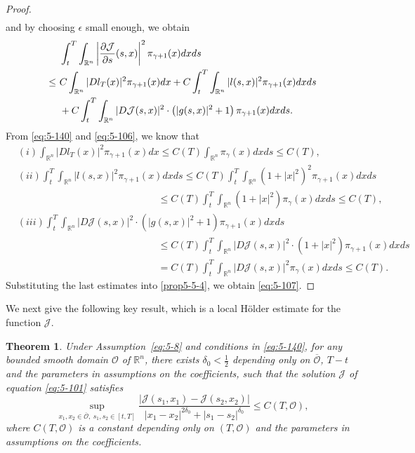\documentclass[11pt]{article}
\numberwithin{equation}{section}
\newtheorem{theorem}{Theorem}[section]
\newcommand{\brn}{{\mathbb{R}^n}}
\newcommand{\1}{\mbox{1\hspace{-1mm}I}}
\begin{document}
\begin{proof}
\begin{align*}
\end{align*}
and by choosing $\epsilon$ small enough, we obtain
\begin{align}
    &\int_{t}^{T}\int_{\brn}\left|\dfrac{\partial\mathcal{J}}{\partial s}(s,x)\right|^{2}\pi_{\gamma+1}(x)dxds \notag \\
    \le\ & C \int_{\brn}|Dl_{T}(x)|^2\pi_{\gamma+1}(x)dx +C \int_{t}^{T}\int_{\brn} |l(s,x)|^2 \pi_{\gamma+1}(x)dxds \notag \\
    &+ C \int_{t}^{T}\int_{\brn} |D\mathcal{J}(s,x)|^2\cdot \left(|g(s,x)|^2+1\right) \pi_{\gamma+1}(x)dxds.  \label{prop5-5-4}
\end{align}
From \eqref{eq:5-140} and \eqref{eq:5-106}, we know that
\begin{align*}
    &(i) \int_{\brn}|Dl_{T}(x)|^2\pi_{\gamma+1}(x)dx \le C(T) \int_{\brn} \pi_{\gamma}(x)dxds \le C(T),\\
    &(ii)\int_{t}^{T}\int_{\brn} |l(s,x)|^2 \pi_{\gamma+1}(x)dxds \le C(T)\int_{t}^{T}\int_{\brn} \left(1+|x|^2\right)^2 \pi_{\gamma+1}(x)dxds \\
    &\;\qquad\qquad\qquad\qquad\qquad\qquad\qquad \le C(T)\int_{t}^{T}\int_{\brn} \left(1+|x|^2\right) \pi_{\gamma}(x)dxds \le C(T),\\
    &(iii)\int_{t}^{T}\int_{\brn} |D\mathcal{J}(s,x)|^2\cdot \left(|g(s,x)|^2+1\right) \pi_{\gamma+1}(x)dxds \\
    &\;\qquad\qquad\qquad\qquad\qquad\qquad\qquad \le C(T) \int_{t}^{T}\int_{\brn} |D\mathcal{J}(s,x)|^2\cdot \left(1+|x|^2\right) \pi_{\gamma+1}(x)dxds\\
    &\;\qquad\qquad\qquad\qquad\qquad\qquad\qquad = C(T) \int_{t}^{T}\int_{\brn} |D\mathcal{J}(s,x)|^2 \pi_{\gamma}(x)dxds \le C(T). 
\end{align*}
Substituting the last estimates into \eqref{prop5-5-4}, we obtain \eqref{eq:5-107}.
\end{proof}

We next give the following key result, which is a local H\"older estimate for the function $\mathcal{J}$.

\begin{theorem}\label{theo5-1}
Under Assumption~\ref{eq:5-8} and conditions in \eqref{eq:5-140}, for any bounded smooth domain $\mathcal{O}$ of $\brn$, there exists $\delta_{0}<\frac{1}{2}$ depending only on $\mathcal{\overline{O}}$, $T-t$ and the parameters in assumptions on the coefficients, such that the solution $\mathcal{J}$ of equation \eqref{eq:5-101} satisfies
\begin{equation}\label{eq:5-108}
    \sup_{x_{1},x_{2}\in\mathcal{\overline{O}},\ s_{1},s_{2}\in[t,T]}\dfrac{\left|\mathcal{J}(s_1, x_{1})-\mathcal{J}(s_2, x_{2})\right|}{|x_{1}-x_{2}|^{2\delta_{0}}+|s_{1}-s_{2}|^{\delta_{0}}}\le C(T,\mathcal{O}),
\end{equation}
where $C(T,\mathcal{O})$ is a constant depending only on $(T,\mathcal{O})$ and the parameters in assumptions on the coefficients.
\end{theorem}
\end{document}
